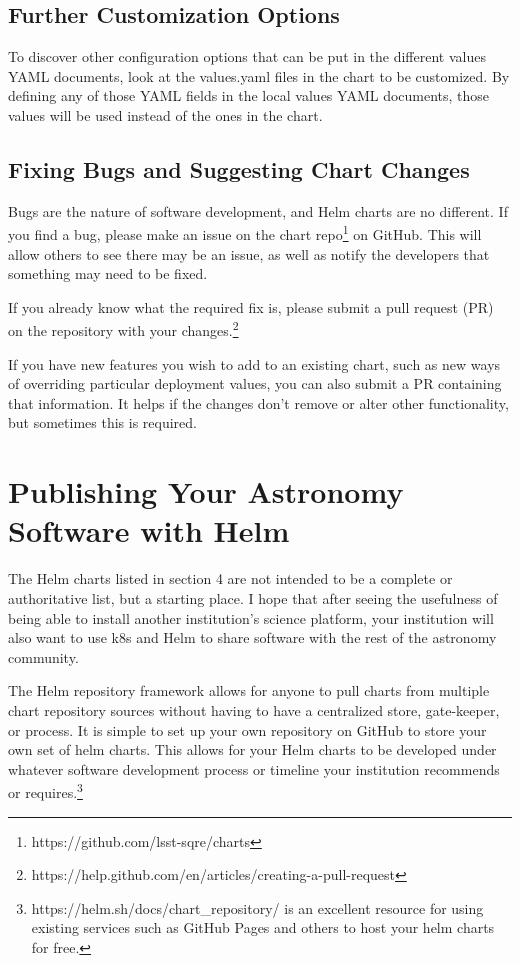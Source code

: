 \documentclass[11pt,twoside]{article}
\begin{document}
\subsection{Further Customization Options}

To discover other configuration options that can be put in the different values YAML
documents, look at the values.yaml files in the chart to be customized.  By defining
any of those YAML fields in the local values YAML documents, those values will be used
instead of the ones in the chart.

\subsection{Fixing Bugs and Suggesting Chart Changes}

Bugs are the nature of software development, and Helm charts are no different.  If you
find a bug, please make an issue on the chart repo\footnote{https://github.com/lsst-sqre/charts}
on GitHub.  This will allow others to see there may be an issue, as well as notify the
developers that something may need to be fixed.

If you already know what the required fix is, please submit a pull request (PR)
on the repository with your changes.\footnote{
https://help.github.com/en/articles/creating-a-pull-request}

If you have new features you wish to add to an existing chart, such as new ways of overriding
particular deployment values, you can also submit a PR containing that information.  It helps
if the changes don't remove or alter other functionality, but sometimes this is required.

\section{Publishing Your Astronomy Software with Helm}

The Helm charts listed in section 4 are not intended to be a complete or authoritative
list, but a starting place.  I hope that after seeing the usefulness of being able
to install another institution's science platform, your institution will also want to
use k8s and Helm to share software with the rest of the astronomy community.

The Helm repository framework allows for anyone to pull charts from multiple chart 
repository sources without having to have a centralized store, gate-keeper, or process.  It is
simple to set up your own repository on GitHub to store your own set of helm charts.
This allows for your Helm charts to be developed under whatever software development 
process or timeline your institution recommends or requires.\footnote{
https://helm.sh/docs/chart\_repository/ is an excellent resource for using existing
services such as GitHub Pages and others to host your helm charts for free.}
\end{document}
